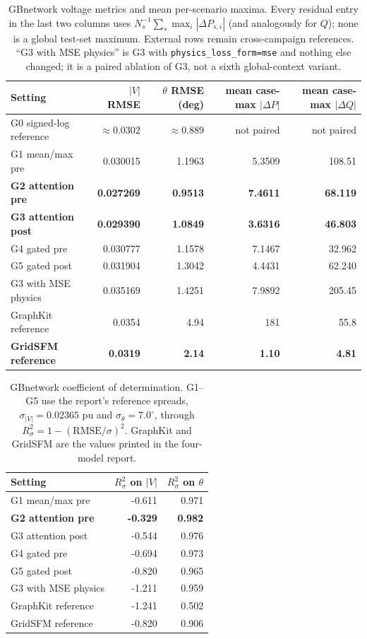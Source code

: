 \documentclass[10pt]{article}
\begin{document}
\begin{table}[H]
\centering\footnotesize
\begin{tabular}{lrrrr}
\toprule
Setting & $|V|$ RMSE & $\theta$ RMSE (deg) & mean case-max $|\Delta P|$ & mean case-max $|\Delta Q|$\\
\midrule
G0 signed-log reference & $\approx0.0302$ & $\approx0.889$ & not paired & not paired\\
G1 mean/max pre & 0.030015 & 1.1963 & 5.3509 & 108.51\\
\textbf{G2 attention pre} & \textbf{0.027269} & \textbf{0.9513} & \textbf{7.4611} & \textbf{68.119}\\
\textbf{G3 attention post} & \textbf{0.029390} & \textbf{1.0849} & \textbf{3.6316} & \textbf{46.803}\\
G4 gated pre & 0.030777 & 1.1578 & 7.1467 & 32.962\\
G5 gated post & 0.031904 & 1.3042 & 4.4431 & 62.240\\
G3 with MSE physics & 0.035169 & 1.4251 & 7.9892 & 205.45\\
GraphKit reference & 0.0354 & 4.94 & 181 & 55.8\\
\textbf{GridSFM reference} & \textbf{0.0319} & \textbf{2.14} & \textbf{1.10} & \textbf{4.81}\\
\bottomrule
\end{tabular}
\caption{GBnetwork voltage metrics and mean per-scenario maxima.  Every
residual entry in the last two columns uses
$N_s^{-1}\sum_s\max_i|\Delta P_{s,i}|$ (and analogously for $Q$); none is a
global test-set maximum.  External rows remain cross-campaign references.
``G3 with MSE physics'' is G3 with \texttt{physics\_loss\_form=mse} and nothing
else changed; it is a paired ablation of G3, not a sixth global-context
variant.}
\end{table}

\begin{table}[H]
\centering\small
\begin{tabular}{lrr}
\toprule
Setting & $R^2_{\sigma}$ on $|V|$ & $R^2_{\sigma}$ on $\theta$\\
\midrule
G1 mean/max pre & -0.611 & 0.971\\
\textbf{G2 attention pre} & \textbf{-0.329} & \textbf{0.982}\\
G3 attention post & -0.544 & 0.976\\
G4 gated pre & -0.694 & 0.973\\
G5 gated post & -0.820 & 0.965\\
G3 with MSE physics & -1.211 & 0.959\\
GraphKit reference & -1.241 & 0.502\\
GridSFM reference & -0.820 & 0.906\\
\bottomrule
\end{tabular}
\caption{GBnetwork coefficient of determination.  G1--G5 use the report's
reference spreads, $\sigma_{|V|}=0.02365$ pu and
$\sigma_\theta=7.0^\circ$, through
$R^2_{\sigma}=1-(\mathrm{RMSE}/\sigma)^2$.  GraphKit and GridSFM are the values printed
in the four-model report.}
\end{table}
\end{document}
